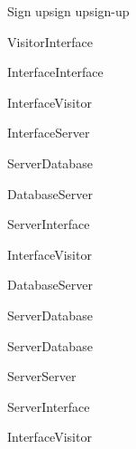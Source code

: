 \begin{sdfig}{Sign up}{sign up}{sign-up}

  \begin{umlcall}[op={Sign up}]{Visitor}{Interface}
    \begin{umlcall}[op={Validate}]{Interface}{Interface}
      \begin{umlfragment}[type=alt, label=valid]
        \begin{umlcall}[type=return,op={Loading}]{Interface}{Visitor}
          \begin{umlcall}[op={Sign up}]{Interface}{Server}
            \begin{umlcall}[op={Has user}]{Server}{Database}
              \begin{umlfragment}[type=alt, label=true]
                \begin{umlcall}[type=return,op={Yes}]{Database}{Server}
                  \begin{umlcall}[type=return,op={Error}]{Server}{Interface}
                    \begin{umlcall}[type=return,op={Error}]{Interface}{Visitor}
                    \end{umlcall}
                  \end{umlcall}
                \end{umlcall}
                \umlfpart[else]
                \begin{umlcall}[type=return,op={No}]{Database}{Server}
                  \begin{umlcall}[op={Create user}]{Server}{Database}
                  \end{umlcall}
                  \begin{umlcall}[op={Create OTP}]{Server}{Database}
                    \begin{umlcall}[op={Send email}]{Server}{Server}
                      \begin{umlcall}[type=return,op={Ok}]{Server}{Interface}
                        \begin{umlcall}[type=return,op={Ok}]{Interface}{Visitor}
                        \end{umlcall}
                      \end{umlcall}
                    \end{umlcall}
                  \end{umlcall}

\end{umlcall}
\end{umlfragment}
\end{umlcall}
\end{umlcall}
\end{umlcall}
\end{umlfragment}
\end{umlcall}
\end{umlcall}
\end{sdfig}
